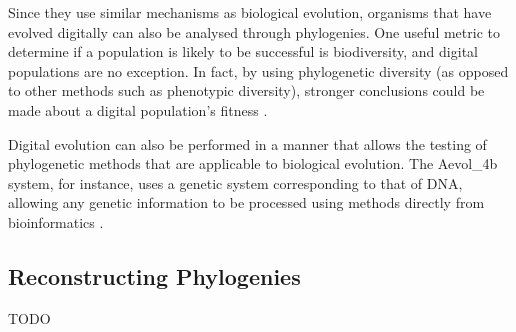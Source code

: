 Since they use similar mechanisms as biological evolution, organisms that have evolved digitally can also be analysed through phylogenies. One useful metric to determine if a population is likely to be successful is biodiversity, and digital populations are no exception. In fact, by using phylogenetic diversity (as opposed to other methods such as phenotypic diversity), stronger conclusions could be made about a digital population's fitness \citep{hernandez2022phylogenetic}.

Digital evolution can also be performed in a manner that allows the testing of phylogenetic methods that are applicable to biological evolution. The Aevol\_4b system, for instance, uses a genetic system corresponding to that of DNA, allowing any genetic information to be processed using methods directly from bioinformatics \citep{daudey2024aevol}.

\subsection{Reconstructing Phylogenies}

TODO
